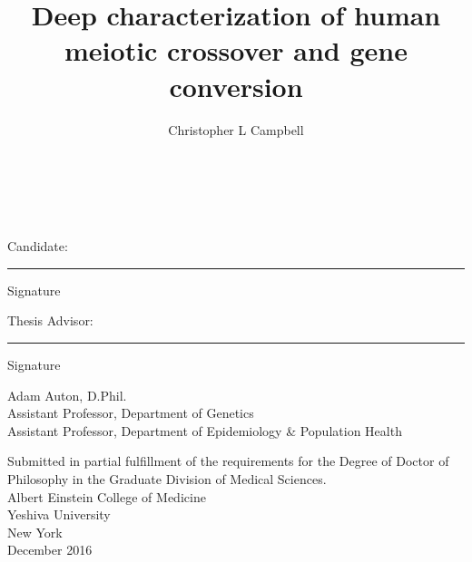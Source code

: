 \documentclass[11pt]{report}
\title{Deep characterization of human meiotic crossover and gene conversion}
\author{Christopher L Campbell}
\begin{document}

\setcounter{tocdepth}{5}
\setcounter{page}{1}

\begin{center}
    \vspace*{1cm}
    \Large{ \textbf{\Title} } \\
    \vspace{1.5cm}
    \normalsize
    \Author \\ \vspace{5cm}
    \begin{minipage}[t]{0.40\textwidth}
        Candidate: \\ \vspace{1cm}
        \vspace{1.0cm}\hrule\smallskip
        Signature
    \end{minipage}
    \hspace{0.5cm}
    \begin{minipage}[t]{0.45\textwidth}
        Thesis Advisor: \\ \vspace{1cm}
        \vspace{1.0cm}\hrule\smallskip
        Signature \\
        \begin{flushleft}
            Adam Auton, D.Phil. \\
            Assistant Professor, Department of Genetics \\
            Assistant Professor, Department of Epidemiology \& Population Health \\
        \end{flushleft}
    \end{minipage}
    \vfill
    Submitted in partial fulfillment of the requirements for the Degree of Doctor of
    Philosophy in the Graduate Division of Medical Sciences.
    \vspace{0.2cm}
    \\ Albert Einstein College of Medicine
    \\ Yeshiva University
    \\ New York
    \\ December 2016
    \\ \vspace{0.8cm}
    
\end{center}
\end{document}
